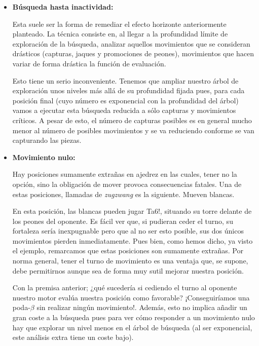 \documentclass[letterpaper,12pt]{article}
\begin{document}
\begin{itemize}
    \item \textbf{Búsqueda hasta inactividad:}
    
    Esta suele ser la forma de remediar el efecto horizonte anteriormente planteado. La 
    técnica consiste en, al llegar a la profundidad límite de exploración de la búsqueda,
    analizar aquellos movimientos que se consideran drásticos (capturas, jaques y promociones
    de peones), movimientos que hacen variar de forma drástica la función de evaluación.
    
    Esto tiene un serio inconveniente. Tenemos que ampliar nuestro árbol de exploración unos
    niveles más allá de su profundidad fijada pues, para cada posición final (cuyo número es
    exponencial con la profundidad del árbol) vamos a ejecutar esta búsqueda reducida a sólo
    capturas y movimientos críticos. A pesar de esto, el número de capturas posibles es en
    general mucho menor al número de posibles movimientos y se va reduciendo conforme se van
    capturando las piezas.
    
    \item \textbf{Movimiento nulo:}
    
    Hay posiciones sumamente extrañas en ajedrez en las cuales, tener no la opción, sino la
    obligación de mover provoca consecuencias fatales. Una de estas posiciones, llamadas de 
    \textit{zugzwang} es la siguiente. Mueven blancas.
    
        \begin{center}
         \chessboard
         [
            maxfield=h8,
            startfen=a8,
            addfen=kbK5/pp6/1P6/8/8/8/R7/8,
            showmover=false
        ]   
    \end{center}
    
    En esta posición, las blancas pueden jugar Ta6!, situando su torre delante de los peones 
    del oponente. Es fácil ver que, si pudieran ceder el turno, su fortaleza sería 
    inexpugnable pero que al no ser esto posible, sus dos únicos movimientos pierden
    inmediatamente. Pues bien, como hemos dicho, ya visto el ejemplo,
    remarcamos que estas posiciones son sumamente extrañas. Por norma general, tener el turno
    de movimiento es una ventaja que, se supone, debe permitirnos aunque sea de forma muy
    sutil mejorar nuestra posición.
    
    Con la premisa anterior; ¿qué sucedería si cediendo el turno al oponente nuestro motor 
    evalúa nuestra posición como favorable? ¡Conseguiríamos una poda-$\beta$ sin realizar 
    ningún movimiento!. Además, esto no implica añadir un gran coste a la búsqueda pues para
    ver cómo responder a un movimiento nulo hay que explorar un nivel menos en el árbol
    de búsqueda (al ser exponencial, este análisis extra tiene un coste bajo).
    

\end{itemize}
\end{document}
